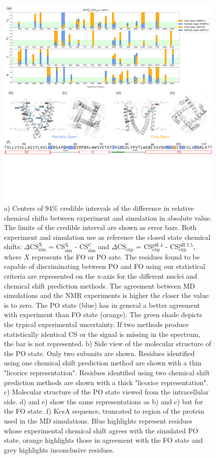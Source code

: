 \documentclass[%
 aip,
 amsmath,amssymb,
 preprint,%
]{revtex4-1}
\begin{document}
\begin{figure}[tbp]
\includegraphics[width=\textwidth, trim={ 0 10cm  0 0},clip]{figures/state_assignment_scheme.pdf}%
\caption{\label{state_assignment_scheme} \scriptsize
    a) Centers of 94$\%$ credible intervals of the difference in relative chemical shifts between experiment and simulation in absolute value. The limits of the credible interval are shown as error bars. Both experiment and simulation use as reference the closed state chemical shifts: $\Delta\text{CS}_{\text{sim}}^{\text{X}}$ = CS$_{\text{sim}}^{\text{X}}$ - CS$_{\text{sim}}^{\text{C}}$  and $\Delta\text{CS}_{\text{exp}}$ = CS$_{\text{exp}}^{\text{pH }4}$ - CS$_{\text{exp}}^{\text{pH }7.5}$, where $X$ represents the FO or PO sate. The residues found to be capable of discriminating between PO and FO using our statistical criteria are represented on the x-axis for the different nuclei and chemical shift prediction methods. The agreement between MD simulations and the NMR experiments is higher the closer the value is to zero. The PO state (blue) has in general a better agreement with experiment than FO state (orange). The green shade depicts the typical experimental uncertainty. If two methods produce statistically identical CS or the signal is missing in the spectrum, the bar is not represented. b) Side view of the molecular structure of the PO state. Only two subunits are shown. Residues identified using one chemical shift prediction method are shown with a thin "licorice representation". Residues identified using two chemical shift prediction methods are shown with a thick "licorice representation". c) Molecular structure of the PO state viewed from the intracellular side. d) and e) show the same representations as b) and c) but for the FO state.
    f) KcsA sequence, truncated to region of the protein used in the MD simulations. Blue highlights represent residues whose experimental chemical shift agrees with the simulated PO state, orange highlights those in agreement with the FO state and grey highlights inconclusive residues.} 
\end{figure}
\end{document}
